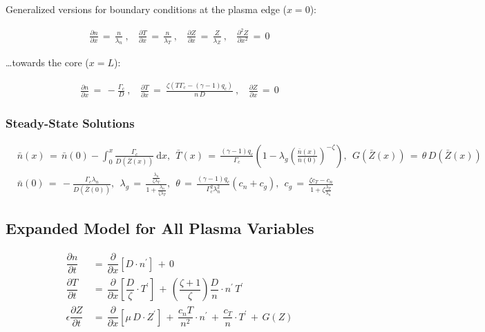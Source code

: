 \documentclass[a4paper,8pt]{article}
\begin{document}
Generalized versions for boundary conditions at the plasma edge
(\(x=0\)):

\begin{align}
    \frac{\partial n}{\partial x} \,=\, \frac{n}{\lambda_n}~, ~~~~\frac{\partial T}{\partial x} \,=\, \frac{n}{\lambda_T}~, ~~~~\frac{\partial Z}{\partial x} \,=\, \frac{Z}{\lambda_Z}~,~~~~ \frac{\partial^2 Z}{\partial x^2} \,=\, 0
\end{align}

\ldots{}towards the core (\(x=L\)):

\begin{align}
    \frac{\partial n}{\partial x} \,=\, -\frac{\Gamma_c}{D}~, ~~~~ \frac{\partial T}{\partial x} \,=\ \frac{\zeta\left(T \Gamma_c - (\gamma - 1) q_c\right)}{n\,D}~, ~~~~\frac{\partial Z}{\partial x} \,=\, 0
\end{align}

\subsubsection{Steady-State Solutions}\label{steady-state-solutions}

\small

\begin{align}
    &\bar{n}(x) \,=\, \bar{n}(0) - \int_0^x \frac{\Gamma_c}{D(\bar{Z}(x))}~\text{d}x, ~~ \bar{T}(x) \,=\, \frac{(\gamma - 1) q_c}{\Gamma_c} \left(1 - \lambda_g\left(\frac{\bar{n}(x)}{\bar{n}(0)}\right)^{-\zeta}\right), ~~ G(\bar{Z}(x)) \,=\, \theta\,D(\bar{Z}(x)) \\
    &\bar{n}(0) \,=\, -\frac{\Gamma_c \lambda_n}{D(\bar{Z}(0))}, ~~ \lambda_g \,=\, \frac{\frac{\lambda_n}{\zeta \lambda_T}}{1 + \frac{\lambda_n}{\zeta \lambda_T}}, ~~ \theta \,=\, \frac{(\gamma - 1) q_c}{\Gamma_c^2 \lambda_n^2} (c_n + c_g), ~~ c_g \,=\, \frac{\zeta c_T - c_n}{1 + \zeta \frac{\lambda_T}{\lambda_n}}
\end{align}

\normalsize

\subsection{Expanded Model for All Plasma
Variables}\label{expanded-model-for-all-plasma-variables}

\begin{align}
    \dfrac{\partial n}{\partial t} \,&=\, \dfrac{\partial}{\partial x}\left[D \cdot n^\prime\right] \,+\, 0 \\
    \dfrac{\partial T}{\partial t} \,&=\, \dfrac{\partial}{\partial x}\left[\dfrac{D}{\zeta} \cdot T^\prime\right] \,+\, \left(\dfrac{\zeta + 1}{\zeta}\right) \dfrac{D}{n} \cdot n^\prime \, T^\prime \\
    \epsilon \dfrac{\partial Z}{\partial t} \,&=\, \dfrac{\partial}{\partial x}\left[\mu\,D \cdot Z^\prime\right] \,+\, \dfrac{c_n T}{n^2} \cdot n^\prime \,+\, \dfrac{c_T}{n} \cdot T^\prime \,+\, G(Z)
\end{align}
\end{document}
